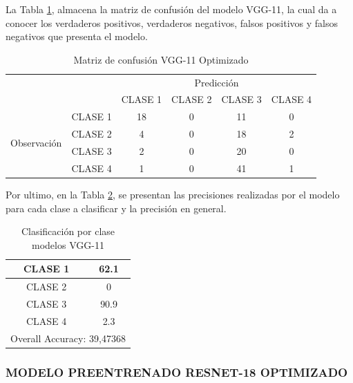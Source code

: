 	\newpage
	La Tabla \ref{tab:MC_VGG11_OPT}, almacena la matriz de confusión del modelo VGG-11, la cual da a conocer los verdaderos positivos, verdaderos negativos, falsos positivos y falsos negativos que presenta el modelo.
		\begin{table}[htbp]
			\centering
			\begin{tabular}{|c|l|c|c|c|c|}
				\hline
				\multicolumn{2}{|c|}{\multirow{2}[4]{*}{}} & \multicolumn{4}{c|}{Predicción} \bigstrut\\
				\cline{3-6}    \multicolumn{2}{|c|}{} & CLASE 1 & CLASE 2 & CLASE 3 & CLASE 4 \bigstrut\\
				\hline
				\multirow{4}[8]{*}{\begin{sideways}Observación\end{sideways}} & CLASE 1 & 18     & 0     & 11    & 0 \bigstrut\\
				\cline{2-6}          & CLASE 2 & 4     & 0     & 18    & 2 \bigstrut\\
				\cline{2-6}          & CLASE 3 & 2     & 0     & 20    & 0 \bigstrut\\
				\cline{2-6}          & CLASE 4 & 1     & 0     & 41    & 1 \bigstrut\\
				\hline
			\end{tabular}%
			\caption{Matriz de confusión VGG-11 Optimizado }
			\label{tab:MC_VGG11_OPT}%
		\end{table}%
	
	Por ultimo, en la Tabla \ref{tab:VGG11optclases}, se presentan las precisiones realizadas por el modelo para cada clase a clasificar y la precisión en general.
	
		\begin{table}[htbp]
			\centering
			\begin{tabular}{|c|c|}
				\hline
				CLASE 1 & 62.1 \bigstrut\\
				\hline
				CLASE 2 & 0 \bigstrut\\
				\hline
				CLASE 3 & 90.9 \bigstrut\\
				\hline
				CLASE 4 & 2.3 \bigstrut\\
				\hline
				\multicolumn{2}{|c|}{Overall Accuracy: 39,47368} \bigstrut\\
				\hline
			\end{tabular}%
			\caption{Clasificación por clase modelos VGG-11}
			\label{tab:VGG11optclases}%
		\end{table}%

	\newpage	
	\subsubsection{\MakeUppercase{Modelo Preentrenado ResNet-18 Optimizado}}
	
